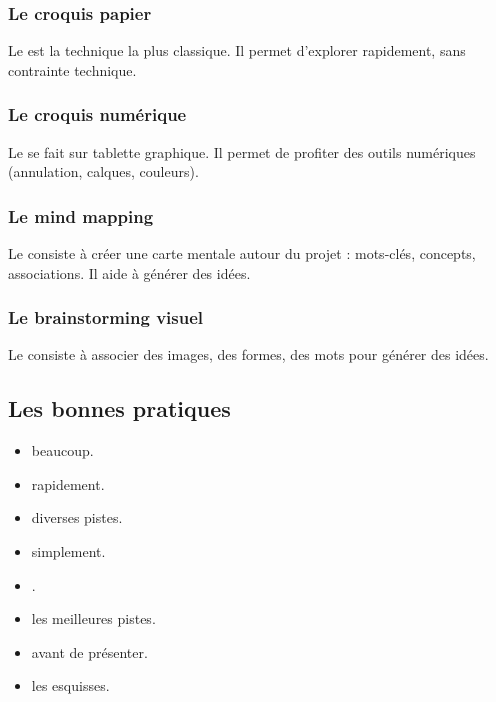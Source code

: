 \subsubsection{Le croquis papier}

Le  est la technique la plus classique. Il permet d'explorer rapidement, sans contrainte technique.

\subsubsection{Le croquis numérique}

Le  se fait sur tablette graphique. Il permet de profiter des outils numériques (annulation, calques, couleurs).

\subsubsection{Le mind mapping}

Le  consiste à créer une carte mentale autour du projet : mots-clés, concepts, associations. Il aide à générer des idées.

\subsubsection{Le brainstorming visuel}

Le  consiste à associer des images, des formes, des mots pour générer des idées.

\subsection{Les bonnes pratiques}

\begin{itemize}
    \item {} beaucoup.
    \item {} rapidement.
    \item {} diverses pistes.
    \item {} simplement.
    \item {}.
    \item {} les meilleures pistes.
    \item {} avant de présenter.
    \item {} les esquisses.
\end{itemize}

